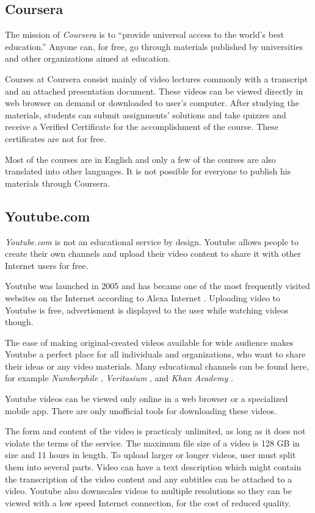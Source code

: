 \subsection{Coursera}
The mission of \textit{Coursera} is to ``provide universal access to the world’s best education.'' \cite{9} Anyone can, for free, go through materials published by universities and other organizations aimed at education.

Courses at Coursera consist mainly of video lectures commonly with a transcript and an  attached presentation document. These videos can be viewed directly in web browser on demand or downloaded to user's computer. After studying the materials, students can submit assignments' solutions and take quizzes and receive a Verified Certificate for the accomplishment of the course. These certificates are not for free.

Most of the courses are in English and only a few of the courses are also translated into other languages. It is not possible for everyone to publish his materials through Coursera.



\subsection{Youtube.com}
\textit{Youtube.com} \cite{10} is not an educational service by design. Youtube allows people to create their own channels and upload their video content to share it with other Internet users for free.

Youtube was launched in 2005 and has became one of the most frequently visited websites on the Internet according to Alexa Internet \cite{11}. Uploading video to Youtube is free, advertisment is displayed to the user while watching videos though.

The ease of making original-created videos available for wide audience makes Youtube a perfect place for all individuals and organizations, who want to share their ideas or any video materials. Many educational channels can be found here, for example \textit{Numberphile} \cite{numberphile_youtube}, \textit{Veritasium} \cite{veritasium_online}, and \textit{Khan Academy} \cite{khan_academy_youtube}.

Youtube videos can be viewed only online in a web browser or a specialized mobile app. There are only unofficial tools for downloading these videos.

The form and content of the video is practicaly unlimited, as long as it does not violate the terms of the service. The maximum file size of a video is 128 GB in size and 11 hours in length. To upload larger or longer videos, user must split them into several parts. Video can have a text description which might contain the transcription of the video content and any subtitles can be attached to a video. Youtube also downscales videos to multiple resolutions so they can be viewed with a low speed Internet connection, for the cost of reduced quality.



